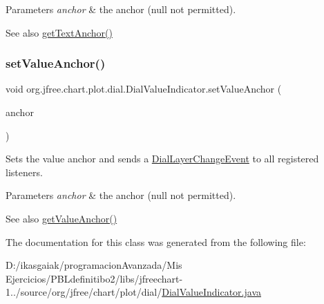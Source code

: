 \begin{DoxyParams}{Parameters}
{\em anchor} & the anchor ({\ttfamily null} not permitted).\\
\hline
\end{DoxyParams}
\begin{DoxySeeAlso}{See also}
\mbox{\hyperlink{classorg_1_1jfree_1_1chart_1_1plot_1_1dial_1_1_dial_value_indicator_a7be9dd7f474e88ad4b961d8ba6e02d4b}{get\+Text\+Anchor()}} 
\end{DoxySeeAlso}
\mbox{\label{classorg_1_1jfree_1_1chart_1_1plot_1_1dial_1_1_dial_value_indicator_a373a9fc36d9bdf03d176e02d3a7101b6}} 
\subsubsection{\texorpdfstring{set\+Value\+Anchor()}{setValueAnchor()}}
{\footnotesize\ttfamily void org.\+jfree.\+chart.\+plot.\+dial.\+Dial\+Value\+Indicator.\+set\+Value\+Anchor (\begin{DoxyParamCaption}\item[{Rectangle\+Anchor}]{anchor }\end{DoxyParamCaption})}

Sets the value anchor and sends a \mbox{\hyperlink{classorg_1_1jfree_1_1chart_1_1plot_1_1dial_1_1_dial_layer_change_event}{Dial\+Layer\+Change\+Event}} to all registered listeners.


\begin{DoxyParams}{Parameters}
{\em anchor} & the anchor ({\ttfamily null} not permitted).\\
\hline
\end{DoxyParams}
\begin{DoxySeeAlso}{See also}
\mbox{\hyperlink{classorg_1_1jfree_1_1chart_1_1plot_1_1dial_1_1_dial_value_indicator_aaacc1d16a645b205f6144deed000fb48}{get\+Value\+Anchor()}} 
\end{DoxySeeAlso}


The documentation for this class was generated from the following file\+:\begin{DoxyCompactItemize}
\item 
D\+:/ikasgaiak/programacion\+Avanzada/\+Mis Ejercicios/\+P\+B\+Ldefinitibo2/libs/jfreechart-\/1../source/org/jfree/chart/plot/dial/\mbox{\hyperlink{_dial_value_indicator_8java}{Dial\+Value\+Indicator.\+java}}\end{DoxyCompactItemize}
